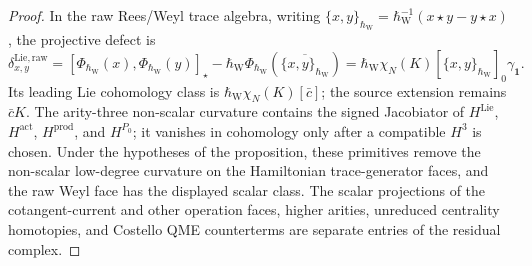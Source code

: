 \begin{proof}
In the raw Rees/Weyl
trace algebra, writing
\(\{x,y\}_{\hbar_{\mathrm W}}
=\hbar_{\mathrm W}^{-1}(x\star y-y\star x)\), the projective defect is
\[
  \delta^{\mathrm{Lie,raw}}_{x,y}
  =
  [\Phi_{\hbar_{\mathrm W}}(x),
    \Phi_{\hbar_{\mathrm W}}(y)]_\star
  -\hbar_{\mathrm W}\Phi_{\hbar_{\mathrm W}}
     (\overline{\{x,y\}_{\hbar_{\mathrm W}}})
  =\hbar_{\mathrm W}\chi_N(K)
    [\{x,y\}_{\hbar_{\mathrm W}}]_0\gamma_{\mathbf1}.
\]
Its leading Lie cohomology class is
\(\hbar_{\mathrm W}\chi_N(K)[\bar c]\); the source extension remains
\(\bar cK\).  The arity-three non-scalar curvature contains the signed
Jacobiator of \(H^{\mathrm{Lie}}\), \(H^{\mathrm{act}}\),
\(H^{\mathrm{prod}}\), and \(H^{P_0}\); it vanishes in cohomology only
after a compatible \(H^3\) is chosen.  Under the hypotheses of the
proposition, these primitives remove the non-scalar low-degree
curvature on the Hamiltonian trace-generator faces, and the raw Weyl
face has the displayed scalar class.  The scalar projections of the
cotangent-current and other operation faces, higher arities, unreduced
centrality homotopies, and Costello QME counterterms are separate
entries of the residual complex.
\end{proof}

